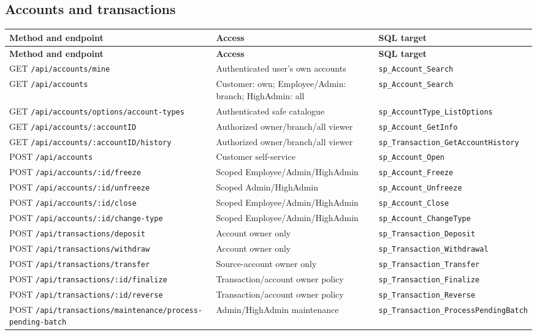 \documentclass[11pt,a4paper,oneside]{report}
\begin{document}
{\subsection{Accounts and transactions}
\begin{longtable}{L{0.40\textwidth}L{0.27\textwidth}L{0.24\textwidth}}
\toprule\textbf{Method and endpoint} & \textbf{Access} & \textbf{SQL target}\\\midrule\endfirsthead
\toprule\textbf{Method and endpoint} & \textbf{Access} & \textbf{SQL target}\\\midrule\endhead
GET \nolinkurl{/api/accounts/mine} & Authenticated user's own accounts & \nolinkurl{sp_Account_Search}\\
GET \nolinkurl{/api/accounts} & Customer: own; Employee/Admin: branch; HighAdmin: all & \nolinkurl{sp_Account_Search}\\
GET \nolinkurl{/api/accounts/options/account-types} & Authenticated safe catalogue & \nolinkurl{sp_AccountType_ListOptions}\\
GET \nolinkurl{/api/accounts/:accountID} & Authorized owner/branch/all viewer & \nolinkurl{sp_Account_GetInfo}\\
GET \nolinkurl{/api/accounts/:accountID/history} & Authorized owner/branch/all viewer & \nolinkurl{sp_Transaction_GetAccountHistory}\\
POST \nolinkurl{/api/accounts} & Customer self-service & \nolinkurl{sp_Account_Open}\\
POST \nolinkurl{/api/accounts/:id/freeze} & Scoped Employee/Admin/HighAdmin & \nolinkurl{sp_Account_Freeze}\\
POST \nolinkurl{/api/accounts/:id/unfreeze} & Scoped Admin/HighAdmin & \nolinkurl{sp_Account_Unfreeze}\\
POST \nolinkurl{/api/accounts/:id/close} & Scoped Employee/Admin/HighAdmin & \nolinkurl{sp_Account_Close}\\
POST \nolinkurl{/api/accounts/:id/change-type} & Scoped Employee/Admin/HighAdmin & \nolinkurl{sp_Account_ChangeType}\\
POST \nolinkurl{/api/transactions/deposit} & Account owner only & \nolinkurl{sp_Transaction_Deposit}\\
POST \nolinkurl{/api/transactions/withdraw} & Account owner only & \nolinkurl{sp_Transaction_Withdrawal}\\
POST \nolinkurl{/api/transactions/transfer} & Source-account owner only & \nolinkurl{sp_Transaction_Transfer}\\
POST \nolinkurl{/api/transactions/:id/finalize} & Transaction/account owner policy & \nolinkurl{sp_Transaction_Finalize}\\
POST \nolinkurl{/api/transactions/:id/reverse} & Transaction/account owner policy & \nolinkurl{sp_Transaction_Reverse}\\
POST \nolinkurl{/api/transactions/maintenance/process-pending-batch} & Admin/HighAdmin maintenance & \nolinkurl{sp_Transaction_ProcessPendingBatch}\\
\bottomrule
\end{longtable}

}
\end{document}

